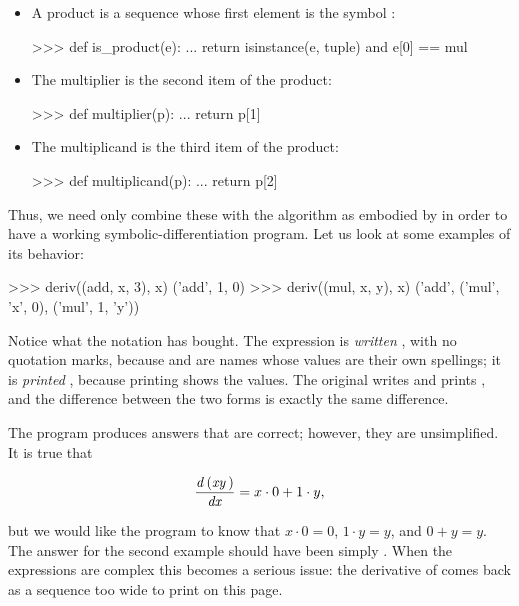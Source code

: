 \begin{itemize}
\item
A product is a sequence whose first element is the symbol :

\begin{codeBlock}
>>> def is_product(e):
...     return isinstance(e, tuple) and e[0] == mul
\end{codeBlock}

\item
The multiplier is the second item of the product:

\begin{codeBlock}
>>> def multiplier(p):
...     return p[1]
\end{codeBlock}

\item
The multiplicand is the third item of the product:

\begin{codeBlock}
>>> def multiplicand(p):
...     return p[2]
\end{codeBlock}
\end{itemize}

\noindent
Thus, we need only combine these with the algorithm as embodied by 
in order to have a working symbolic-differentiation program.  Let us look at
some examples of its behavior:

\begin{codeBlock}
>>> deriv((add, x, 3), x)
('add', 1, 0)
>>> deriv((mul, x, y), x)
('add', ('mul', 'x', 0), ('mul', 1, 'y'))
\end{codeBlock}

\noindent
Notice what the notation has bought.  The expression is \emph{written}
, with no quotation marks, because  and 
are names whose values are their own spellings; it is \emph{printed}
, because printing shows the values.  The original writes
 and prints , and the difference between the two
forms is exactly the same difference.

The program produces answers that are correct; however, they are unsimplified.
It is true that

$$ \frac{{\it d\,(xy\,)}}{{\it dx}} = x \cdot 0 + 1 \cdot y, $$

\noindent
but we would like the program to know that \( x \cdot 0 = 0 \), \( 1 \cdot y = y \),
and \( 0 + y = y \).  The answer for the second example should have been
simply .  When the expressions are complex this becomes a serious
issue: the derivative of  comes back as a
sequence too wide to print on this page.

